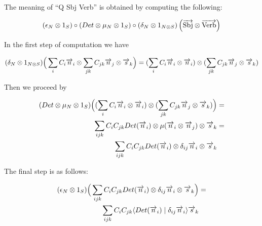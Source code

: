 The meaning of ``Q Sbj Verb'' is obtained by computing the following:

\[
(\epsilon_N \otimes 1_S) \circ (Det \otimes  \mu_N \otimes 1_S) \circ (\delta_N \otimes 1_{N \otimes S})\left(\overrightarrow{\text{Sbj}} \otimes \overrightarrow{\text{Verb}}\right)
\]

In the first step of computation we have

\begin{align*}
(\delta_N \otimes 1_{N \otimes S})\Big(\sum_i C_i \overrightarrow{n}_i \otimes \sum_{jk} C_{jk} \overrightarrow{n}_j \otimes \overrightarrow{s}_k\Big) = 
(\sum_i C_i \overrightarrow{n}_i \otimes \overrightarrow{n}_i) \otimes  (\sum_{jk} C_{jk} \overrightarrow{n}_j \otimes \overrightarrow{s}_k)
\end{align*}

\noindent
Then we proceed by

\begin{align*}
(Det \otimes  \mu_N \otimes 1_S)\Big((\sum_i C_i \overrightarrow{n}_i \otimes \overrightarrow{n}_i) \otimes  (\sum_{jk} C_{jk} \overrightarrow{n}_j \otimes \overrightarrow{s}_k)\Big) &= \\
\sum_{ijk} C_i C_{jk} Det(\overrightarrow{n}_i) \otimes \mu(\overrightarrow{n}_i \otimes \overrightarrow{n}_j) \otimes \overrightarrow{s}_k &=\\
\sum_{ijk} C_i C_{jk} Det(\overrightarrow{n}_i) \otimes \delta_{ij} \overrightarrow{n}_i \otimes \overrightarrow{s}_k&
\end{align*}

\noindent
The final step is as follows:

\begin{align*}
(\epsilon_{N} \otimes 1_S)  \Big(\sum_{ijk} C_i C_{jk} Det(\overrightarrow{n}_i) \otimes \delta_{ij} \overrightarrow{n}_i \otimes \overrightarrow{s}_k \Big) &=   \\
\sum_{ijk} C_i C_{jk} \langle Det(\overrightarrow{n}_i) \mid \delta_{ij} \overrightarrow{n}_i \rangle \overrightarrow{s}_k
\end{align*}


